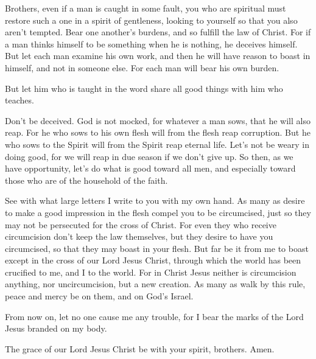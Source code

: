  Brothers, even if a man is caught in some fault, you who
are spiritual must restore such a one in a spirit of gentleness, looking
to yourself so that you also aren't tempted.  Bear one
another's burdens, and so fulfill the law of Christ.  For
if a man thinks himself to be something when he is nothing, he deceives
himself.  But let each man examine his own work, and then
he will have reason to boast in himself, and not in someone else.
 For each man will bear his own burden.

 But let him who is taught in the word share all good
things with him who teaches.

 Don't be deceived. God is not mocked, for whatever a man
sows, that he will also reap.  For he who sows to his own
flesh will from the flesh reap corruption. But he who sows to the Spirit
will from the Spirit reap eternal life.  Let's not be
weary in doing good, for we will reap in due season if we don't give up.
 So then, as we have opportunity, let's do what is good
toward all men, and especially toward those who are of the household of
the faith.

 See with what large letters I write to you with my own
hand.  As many as desire to make a good impression in the
flesh compel you to be circumcised, just so they may not be persecuted
for the cross of Christ.  For even they who receive
circumcision don't keep the law themselves, but they desire to have you
circumcised, so that they may boast in your flesh.  But
far be it from me to boast except in the cross of our Lord Jesus Christ,
through which the world has been crucified to me, and I to the world.
 For in Christ Jesus neither is circumcision anything,
nor uncircumcision, but a new creation.  As many as walk
by this rule, peace and mercy be on them, and on God's Israel.

 From now on, let no one cause me any trouble, for I bear
the marks of the Lord Jesus branded on my body.

 The grace of our Lord Jesus Christ be with your spirit,
brothers. Amen.
